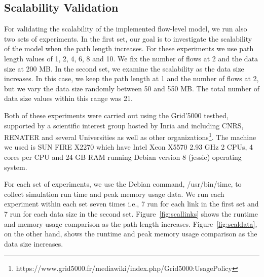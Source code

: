 \subsection{Scalability Validation}
For validating the scalability of the implemented flow-level model, we run also two sets of experiments. In the first set, our goal is to investigate the scalability of the model when the path length increases. For these experiments we use path length values of 1, 2, 4, 6, 8 and 10. We fix the number of flows at 2 and the data size at 200 MB. In the second set, we examine the scalability as the data size increases. In this case, we keep the path length at 1 and the number of flows at 2, but we vary the data size randomly between 50 and 550 MB. The total number of data size values within this range was 21. 

Both of these experiments were carried out using the Grid'5000 testbed, supported by a scientific interest group hosted by Inria and including CNRS, RENATER and several Universities as well as other organizations\footnote{https://www.grid5000.fr/mediawiki/index.php/Grid5000:UsagePolicy}. The machine we used is SUN FIRE X2270 which have Intel Xeon X5570 2.93 GHz 2 CPUs, 4 cores per CPU and 24 GB RAM running Debian version 8 (jessie) operating system.

For each set of experiments, we use the Debian command, /usr/bin/time, to collect simulation run time and peak memory usage data. We run each experiment within each set seven times i.e., 7 run for each link in the first set and 7 run for each data size in the second set. Figure~\ref{fig:scallinks} shows the runtime and memory usage comparison as the path length increases. Figure~\ref{fig:scaldata}, on the other hand, shows the runtime and peak memory usage comparison as the data size increases.

